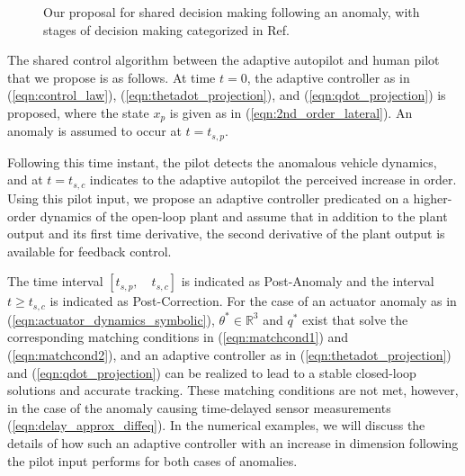 \begin{figure}[h]

	\caption{Our proposal for shared decision making following an anomaly, with stages of decision making categorized in Ref.~\cite{parasuraman2000model}}
	\label{fig:response_flow}
\end{figure}

The shared control algorithm between the adaptive autopilot and human pilot that we propose is as follows. At time $t=0$, the adaptive controller as in (\ref{eqn:control_law}), (\ref{eqn:thetadot_projection}), and (\ref{eqn:qdot_projection}) is proposed, where the state $x_p$ is given as in (\ref{eqn:2nd_order_lateral}). An anomaly is assumed to occur at $t=t_{s,p}$. 

Following this time instant, the pilot detects the anomalous vehicle dynamics, and at $t=t_{s,c}$ indicates to the adaptive autopilot the perceived increase in order. Using this pilot input, we propose an adaptive controller predicated on a higher-order dynamics of the open-loop plant and assume that in addition to the plant output and its first time derivative, the second derivative of the plant output is available for feedback control. 

The time interval $[t_{s,p}, \quad t_{s,c}]$ is indicated as Post-Anomaly and the interval $t \geq t_{s,c}$ is indicated as Post-Correction. For the case of an actuator anomaly as in (\ref{eqn:actuator_dynamics_symbolic}), $\theta^* \in \mathbb{R}^3$ and $q^*$ exist that solve the corresponding matching conditions in (\ref{eqn:matchcond1}) and (\ref{eqn:matchcond2}), and an adaptive controller as in (\ref{eqn:thetadot_projection}) and (\ref{eqn:qdot_projection}) can be realized to lead to a stable closed-loop solutions and accurate tracking. These matching conditions are not met, however, in the case of the anomaly causing time-delayed sensor measurements (\ref{eqn:delay_approx_diffeq}). In the numerical examples, we will discuss the details of how such an adaptive controller with an increase in dimension following the pilot input performs for both cases of anomalies. 

